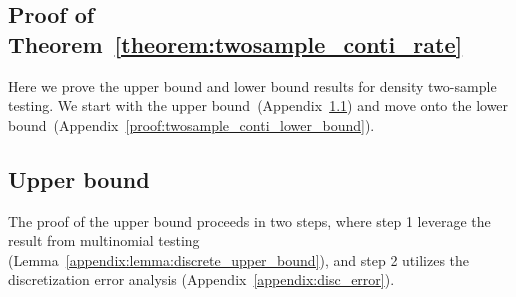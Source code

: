 \documentclass[twoside,11pt]{article}
\begin{document}
\begin{appendix}
	\section{Proof of Theorem~\ref{theorem:twosample_conti_rate}}\label{proof:twosample_conti_rates}
	Here we prove the upper bound and lower bound results for density two-sample testing.
	We start with the upper bound~(Appendix~\ref{proof_theorem:twosample_conti_rate}) and move onto the lower bound~(Appendix~\ref{proof:twosample_conti_lower_bound}).
	\subsection{Upper bound}\label{proof_theorem:twosample_conti_rate}
	The proof of the upper bound  proceeds in two steps, where step 1 leverage the result from multinomial testing (Lemma~\ref{appendix:lemma:discrete_upper_bound}), and step 2 utilizes the discretization error analysis (Appendix~\ref{appendix:disc_error}). 

\end{appendix}
\end{document}
